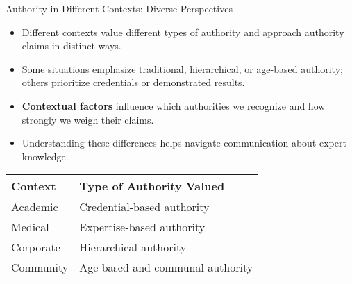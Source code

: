 \documentclass{beamer}
\begin{document}
\begin{frame}{Authority in Different Contexts: Diverse Perspectives}
    \begin{itemize}
        \item Different contexts value different types of authority and approach authority claims in distinct ways.
        \item Some situations emphasize traditional, hierarchical, or age-based authority; others prioritize credentials or demonstrated results.
        \item \textbf{Contextual factors} influence which authorities we recognize and how strongly we weigh their claims.
        \item Understanding these differences helps navigate communication about expert knowledge.
    \end{itemize}
    
    \begin{table}
        \centering
        \begin{tabular}{|l|l|}
            \hline
            \textbf{Context} & \textbf{Type of Authority Valued} \\
            \hline
            Academic & Credential-based authority \\
            Medical & Expertise-based authority \\
            Corporate & Hierarchical authority \\
            Community & Age-based and communal authority \\
            \hline
        \end{tabular}
    \end{table}
\end{frame}
\end{document}
